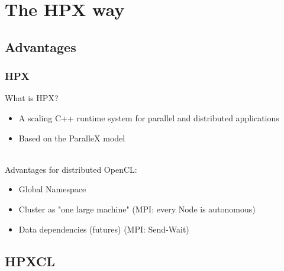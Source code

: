 \documentclass{beamer}
\begin{document}
\section{The HPX way}

\subsection{Advantages}
\begin{frame}
    \frametitle{HPX}
    What is HPX?
    \begin{itemize}
        \item A scaling C++ runtime system for parallel and distributed applications
        \item Based on the ParalleX model
    \end{itemize}
    ~\\
    Advantages for distributed OpenCL:
    \begin{itemize}
        \item Global Namespace
        \item Cluster as "one large machine" (MPI: every Node is autonomous)
        \item Data dependencies (futures) (MPI: Send-Wait)
    \end{itemize}
\end{frame}

\subsection{HPXCL}
\end{document}
